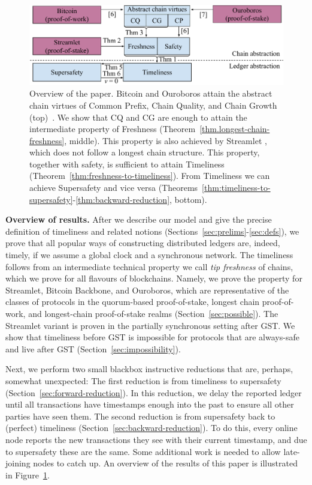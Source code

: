 \begin{figure}
  \centering
  \includegraphics[width=1.0\columnwidth,keepaspectratio]{figures/timeliness-overview.pdf}
  \caption{Overview of the paper. Bitcoin and Ouroboros attain the abstract chain virtues
  of Common Prefix, Chain Quality, and Chain Growth (top)~\cite{backbone,ouroboros}.
  We show that CQ and CG are enough  to attain the intermediate property of Freshness
  (Theorem~\ref{thm.longest-chain-freshness}, middle). This property is also achieved by Streamlet , which does
  not follow a longest chain structure. This property, together with safety,
  is sufficient to attain Timeliness
  (Theorem~\ref{thm:freshness-to-timeliness}). From Timeliness we can achieve Supersafety
  and vice versa (Theorems~\ref{thm:timeliness-to-supersafety}-\ref{thm:backward-reduction}, bottom).
  }
 \label{fig:overview}
\end{figure}

\noindent
\textbf{Overview of results.}
After we describe our model and give the precise definition
of timeliness and related notions (Sections~\ref{sec:prelims}-\ref{sec:defs}),
we prove that all popular ways of constructing distributed ledgers
are, indeed, timely, if we assume a global clock and a synchronous network.
The timeliness follows from an intermediate technical property we call \emph{tip freshness}
of chains, which we prove for all flavours of blockchains. Namely, we prove the
property for Streamlet, Bitcoin Backbone, and Ouroboros, which are representative
of the classes of protocols in the quorum-based proof-of-stake, longest chain
proof-of-work, and longest-chain proof-of-stake realms (Section~\ref{sec:possible}).
The Streamlet variant is proven in the partially synchronous setting after GST.
We show that timeliness before GST is impossible for protocols that are always-safe
and live after GST (Section~\ref{sec:impossibility}).

Next, we perform two small blackbox instructive reductions that are, perhaps, somewhat unexpected:
The first reduction is from timeliness to supersafety (Section~\ref{sec:forward-reduction}).
In this reduction, we delay the reported ledger until all
transactions have timestamps enough into the past to ensure all other parties have seen them.
The second reduction is from supersafety back to (perfect) timeliness (Section~\ref{sec:backward-reduction}).
To do this, every online node reports the new transactions they see with
their current timestamp, and due to supersafety these are the same.
Some additional work is needed to allow late-joining nodes to catch up.
An overview of the results of this paper is illustrated in Figure~\ref{fig:overview}.

